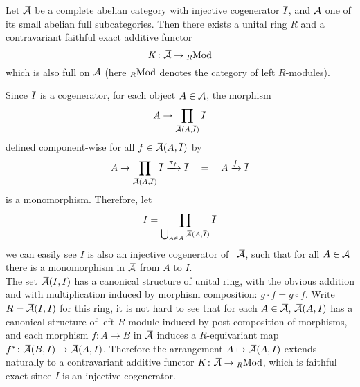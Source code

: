 \documentclass[twoside]{article}
\begin{document}
\begin{prop}\label{main}
Let $\bea$ be a complete abelian category with injective cogenerator $\Ibar$, and ${\mathcal{A}}$ one of its small abelian full subcategories. Then there exists a unital ring $R$ and a contravariant faithful exact additive  functor $$K\colon \bea \rightarrow \rmod$$ which is also full on ${\mathcal{A}}$ (here ${}_R\mathrm{Mod}$ denotes the category of left $R$-modules).
\end{prop}
\pf
Since $\Ibar$ is a cogenerator, for each object $A \in {\mathcal{A}}$, the morphism $$A \rightarrow \prod_{\bea(A, \Ibar)} \Ibar$$ defined component-wise for all $f \in \bea(A, \Ibar)$ by
$$A \rightarrow \prod_{\bea(A, \Ibar)} \Ibar \xrightarrow{\pi_f} \Ibar \quad = \quad A \xrightarrow{f} \Ibar$$
is a monomorphism. Therefore, let $$I = \prod_{\bigcup_{A \in \EA} \bea(A, \Ibar)} \Ibar$$ we can easily see $I$ is also an injective cogenerator of  \ $\bea$, such that for all $A \in {\mathcal{A}}$ there is a monomorphism in $\bea$ from $A$ to $I$.  \\

The set $\bea(I,I)$ has a canonical structure of unital ring, with the obvious addition and with multiplication induced by morphism composition: $g \cdot f = g \circ f$. Write $R = \bea(I,I)$ for this ring, it is not hard to see that for each $A \in \bea$, $\bea(A,I)$ has a canonical structure of left $R$-module induced by post-composition of morphisms, and each morphism $f\colon A \rightarrow B$ in $\bea$ induces a $R$-equivariant map $f^\ast\colon \bea(B, I) \rightarrow \bea(A,I)$. Therefore the arrangement $A \mapsto \bea(A,I)$ extends naturally to a contravariant additive functor $K\colon \bea \rightarrow \rmod$, which is faithful exact since $I$ is an injective cogenerator.\\
\end{document}
